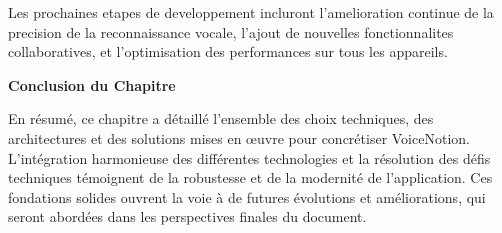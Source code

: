 Les prochaines etapes de developpement incluront l'amelioration continue de la precision de la reconnaissance vocale, l'ajout de nouvelles fonctionnalites collaboratives, et l'optimisation des performances sur tous les appareils. 

\vspace{1cm}
\begin{center}
\textbf{\large Conclusion du Chapitre}
\end{center}

\noindent
En résumé, ce chapitre a détaillé l'ensemble des choix techniques, des architectures et des solutions mises en œuvre pour concrétiser VoiceNotion. L'intégration harmonieuse des différentes technologies et la résolution des défis techniques témoignent de la robustesse et de la modernité de l'application. Ces fondations solides ouvrent la voie à de futures évolutions et améliorations, qui seront abordées dans les perspectives finales du document.